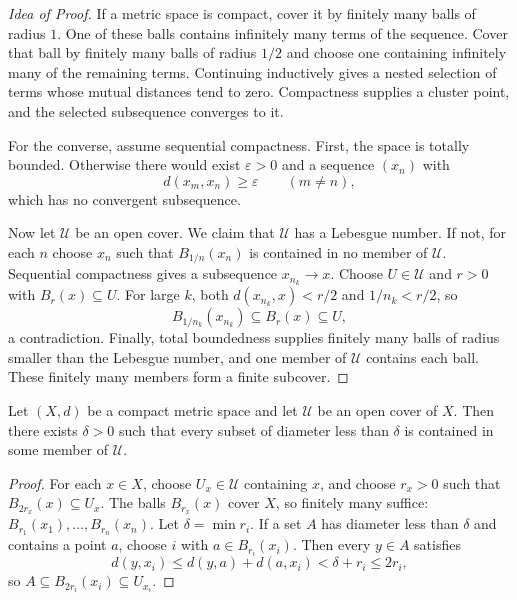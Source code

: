\begin{proof}[Idea of Proof]
If a metric space is compact, cover it by finitely many balls of radius $1$. One of these balls contains infinitely many terms of the sequence. Cover that ball by finitely many balls of radius $1/2$ and choose one containing infinitely many of the remaining terms. Continuing inductively gives a nested selection of terms whose mutual distances tend to zero. Compactness supplies a cluster point, and the selected subsequence converges to it.

For the converse, assume sequential compactness. First, the space is totally bounded. Otherwise there would exist $\varepsilon>0$ and a sequence $(x_n)$ with
\[
    d(x_m,x_n)\geq\varepsilon\qquad(m\neq n),
\]
which has no convergent subsequence.

Now let $\mathcal{U}$ be an open cover. We claim that $\mathcal{U}$ has a Lebesgue number. If not, for each $n$ choose $x_n$ such that $B_{1/n}(x_n)$ is contained in no member of $\mathcal{U}$. Sequential compactness gives a subsequence $x_{n_k}\to x$. Choose $U\in\mathcal{U}$ and $r>0$ with $B_r(x)\subseteq U$. For large $k$, both $d(x_{n_k},x)<r/2$ and $1/n_k<r/2$, so
\[
    B_{1/n_k}(x_{n_k})\subseteq B_r(x)\subseteq U,
\]
a contradiction. Finally, total boundedness supplies finitely many balls of radius smaller than the Lebesgue number, and one member of $\mathcal{U}$ contains each ball. These finitely many members form a finite subcover.
\end{proof}

\begin{theorem}
Let $(X,d)$ be a compact metric space and let $\mathcal{U}$ be an open cover of $X$. Then there exists $\delta>0$ such that every subset of diameter less than $\delta$ is contained in some member of $\mathcal{U}$.
\end{theorem}

\begin{proof}
For each $x\in X$, choose $U_x\in\mathcal{U}$ containing $x$, and choose $r_x>0$ such that $B_{2r_x}(x)\subseteq U_x$. The balls $B_{r_x}(x)$ cover $X$, so finitely many suffice: $B_{r_1}(x_1),\dots,B_{r_n}(x_n)$. Let $\delta=\min r_i$. If a set $A$ has diameter less than $\delta$ and contains a point $a$, choose $i$ with $a\in B_{r_i}(x_i)$. Then every $y\in A$ satisfies
\[
    d(y,x_i)\leq d(y,a)+d(a,x_i)<\delta+r_i\leq 2r_i,
\]
so $A\subseteq B_{2r_i}(x_i)\subseteq U_{x_i}$.
\end{proof}

